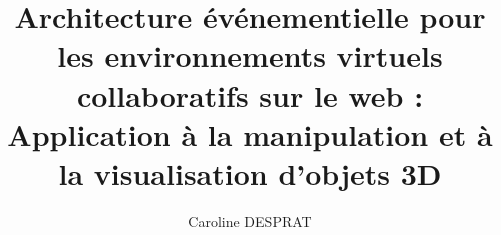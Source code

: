\documentclass{book}
\title{\textbf{\large Architecture événementielle pour les environnements virtuels 
collaboratifs sur le web : Application à la manipulation et à la visualisation 
d'objets 3D}}
\author{Caroline DESPRAT}
\begin{document}
    \makeflyleaf
\end{document}
